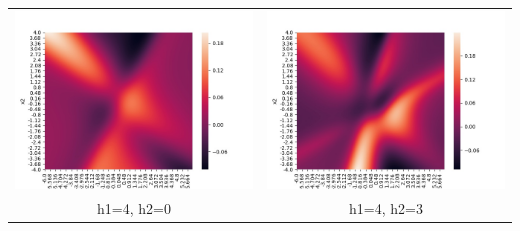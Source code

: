 \documentclass[twoside]{article}
\begin{document}
\begin{tabular}{ cc } 
	\includegraphics[scale=0.5]{heatmaps1/B4_0} & \includegraphics[scale=0.5]{heatmaps1/B4_3} \\ 
	h1=4, h2=0 & h1=4, h2=3 \\ 

\end{tabular}
\end{document}
